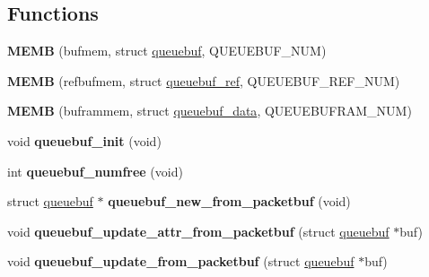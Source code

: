 \subsection*{Functions}
\begin{DoxyCompactItemize}
\item 
\hypertarget{group__rimequeuebuf_ga23770096f723ca5a6199c6125c27b247}{}{\bfseries M\+E\+M\+B} (bufmem, struct \hyperlink{structqueuebuf}{queuebuf}, Q\+U\+E\+U\+E\+B\+U\+F\+\_\+\+N\+U\+M)\label{group__rimequeuebuf_ga23770096f723ca5a6199c6125c27b247}

\item 
\hypertarget{group__rimequeuebuf_ga21c83bb99a9cd70b3159d394ccde773f}{}{\bfseries M\+E\+M\+B} (refbufmem, struct \hyperlink{structqueuebuf__ref}{queuebuf\+\_\+ref}, Q\+U\+E\+U\+E\+B\+U\+F\+\_\+\+R\+E\+F\+\_\+\+N\+U\+M)\label{group__rimequeuebuf_ga21c83bb99a9cd70b3159d394ccde773f}

\item 
\hypertarget{group__rimequeuebuf_ga74eb2ce868ce3a0cb3740d0e11591e03}{}{\bfseries M\+E\+M\+B} (buframmem, struct \hyperlink{structqueuebuf__data}{queuebuf\+\_\+data}, Q\+U\+E\+U\+E\+B\+U\+F\+R\+A\+M\+\_\+\+N\+U\+M)\label{group__rimequeuebuf_ga74eb2ce868ce3a0cb3740d0e11591e03}

\item 
\hypertarget{group__rimequeuebuf_ga12bfe2347ba1ee1bdb5f826259c91448}{}void {\bfseries queuebuf\+\_\+init} (void)\label{group__rimequeuebuf_ga12bfe2347ba1ee1bdb5f826259c91448}

\item 
\hypertarget{group__rimequeuebuf_ga95288daee79a9a5af245c5e2060d7e8f}{}int {\bfseries queuebuf\+\_\+numfree} (void)\label{group__rimequeuebuf_ga95288daee79a9a5af245c5e2060d7e8f}

\item 
\hypertarget{group__rimequeuebuf_ga1bffbaed6a4196167b9435bb6240a20d}{}struct \hyperlink{structqueuebuf}{queuebuf} $\ast$ {\bfseries queuebuf\+\_\+new\+\_\+from\+\_\+packetbuf} (void)\label{group__rimequeuebuf_ga1bffbaed6a4196167b9435bb6240a20d}

\item 
\hypertarget{group__rimequeuebuf_ga6cd637fe23486526bbae9ee6517901c4}{}void {\bfseries queuebuf\+\_\+update\+\_\+attr\+\_\+from\+\_\+packetbuf} (struct \hyperlink{structqueuebuf}{queuebuf} $\ast$buf)\label{group__rimequeuebuf_ga6cd637fe23486526bbae9ee6517901c4}

\item 
\hypertarget{group__rimequeuebuf_gaa44690862cb3ba1145b25ad8671d29a9}{}void {\bfseries queuebuf\+\_\+update\+\_\+from\+\_\+packetbuf} (struct \hyperlink{structqueuebuf}{queuebuf} $\ast$buf)\label{group__rimequeuebuf_gaa44690862cb3ba1145b25ad8671d29a9}


\end{DoxyCompactItemize}

